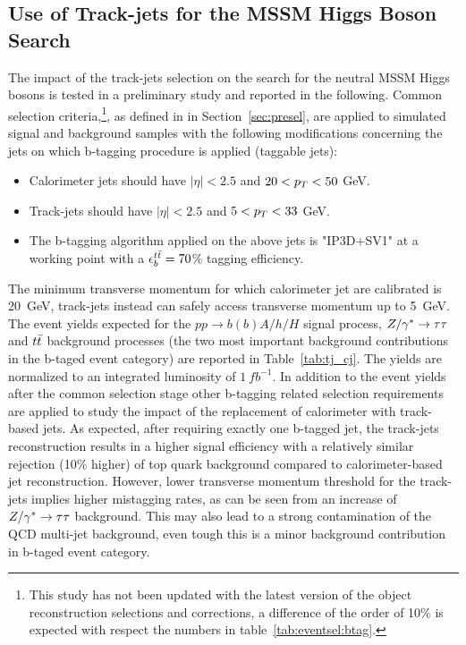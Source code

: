 \subsection{ Use of Track-jets for the MSSM Higgs Boson Search} %
The impact of the track-jets selection on the search for the neutral MSSM Higgs bosons is tested in a 
preliminary study and reported in the  following. 
Common selection criteria,\footnote{This study has not been updated with the latest version of the object reconstruction 
		selections and corrections, a difference of the order of 10\% is expected with respect the 
	    	numbers in table~\ref{tab:eventsel:btag}.},
as defined in in Section~\ref{sec:presel}, are applied to simulated signal and background samples with the following modifications
concerning the jets on which b-tagging procedure is applied (taggable jets):
\begin{itemize}
\item Calorimeter jets should have $|\eta| < 2.5$ and $20 < p_{T} < 50$ GeV.
\item Track-jets should have $|\eta| < 2.5$ and $5 < p_{T} < 33$ GeV.
\item The b-tagging algorithm applied on the above jets is "IP3D+SV1" at a 
	working point with a $\epsilon_b^{t\bar{t}}=70$\% tagging efficiency.
\end{itemize}
The minimum transverse momentum for which calorimeter jet are calibrated is 20~GeV, track-jets instead can 
safely access transverse momentum up to 5~GeV.
The event yields expected for the $pp \rightarrow b(b)A/h/H$ signal process, $Z/\gamma^*\rightarrow \tau\tau$  and $t\bar{t}$ background processes
(the two most important background contributions in the b-taged event category) 
are reported in Table~\ref{tab:tj_cj}. The yields are  normalized to an integrated luminosity of $1 ~ fb^{-1}$.
In addition to the event yields after the common selection stage other b-tagging related selection
requirements  are applied to study the impact of the replacement of calorimeter with track-based jets.
As expected, after requiring exactly one b-tagged jet, the track-jets reconstruction 
results in a higher signal efficiency with a relatively similar rejection (10\% higher) of top quark 
background compared to calorimeter-based jet reconstruction.
However, lower transverse momentum threshold for the  track-jets implies higher mistagging rates,
as can be seen from an increase of $Z/\gamma^*\rightarrow \tau\tau$ background. This may also lead to a strong contamination of the 
QCD multi-jet background, even tough this is a minor background contribution in b-taged event category.

